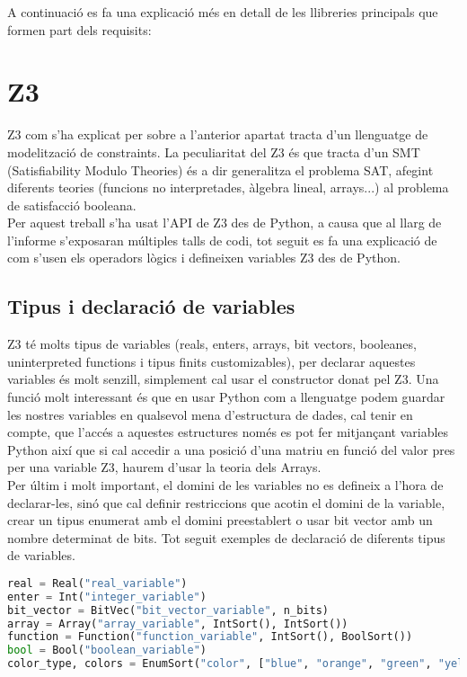 A continuació es fa una explicació més en detall de les llibreries principals que formen part dels requisits:

\section{Z3}
Z3 com s'ha explicat per sobre a l'anterior apartat tracta d'un llenguatge de modelització de constraints. La peculiaritat del Z3 és que tracta d'un SMT (Satisfiability Modulo Theories) és a dir generalitza el problema SAT, afegint diferents teories (funcions no interpretades, àlgebra lineal, arrays...) al problema de satisfacció booleana.\\

Per aquest treball s'ha usat l'API de Z3 des de Python, a causa que al llarg de l'informe s'exposaran múltiples talls de codi, tot seguit es fa una explicació de com s'usen els operadors lògics i defineixen variables Z3 des de Python.

\subsection{Tipus i declaració de variables}
Z3 té molts tipus de variables (reals, enters, arrays, bit vectors, booleanes, uninterpreted functions i tipus finits customizables), per declarar aquestes variables és molt senzill, simplement cal usar el constructor donat pel Z3. Una funció molt interessant és que en usar Python com a llenguatge podem guardar les nostres variables en qualsevol mena d'estructura de dades, cal tenir en compte, que l'accés a aquestes estructures només es pot fer mitjançant variables Python així que si cal accedir a una posició d'una matriu en funció del valor pres per una variable Z3, haurem d'usar la teoria dels Arrays.\\
Per últim i molt important, el domini de les variables no es defineix a l'hora de declarar-les, sinó que cal definir restriccions que acotin el domini de la variable, crear un tipus enumerat amb el domini preestablert o usar bit vector amb un nombre determinat de bits.
Tot seguit exemples de declaració de diferents tipus de variables.

\begin{lstlisting}[language=Python, caption=Declaració de variables]
real = Real("real_variable")
enter = Int("integer_variable")
bit_vector = BitVec("bit_vector_variable", n_bits)
array = Array("array_variable", IntSort(), IntSort())
function = Function("function_variable", IntSort(), BoolSort())
bool = Bool("boolean_variable")
color_type, colors = EnumSort("color", ["blue", "orange", "green", "yellow", "red"])
\end{lstlisting}

